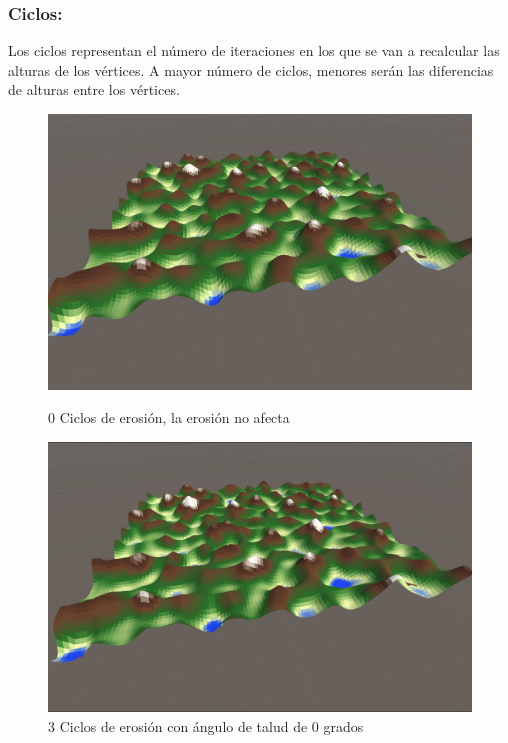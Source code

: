 \subsubsection{Ciclos: }Los ciclos representan el número de iteraciones en los que se van a recalcular las alturas de los vértices. A mayor número de ciclos, menores serán las diferencias de alturas entre los vértices.    
\begin{figure}[ht]
    \centering
    \begin{minipage}{0.4\textwidth}
        \centering
        \includegraphics[width=\textwidth]{img/0ciclos.png}
        \caption{0 Ciclos de erosión, la erosión no afecta}
    \end{minipage}%
    \hfill
    \begin{minipage}{0.4\textwidth}
        \centering
        \includegraphics[width=\textwidth]{img/3ciclos.png}
        \caption{3 Ciclos de erosión con ángulo de talud de 0 grados}
    \end{minipage}
    

\end{figure}
